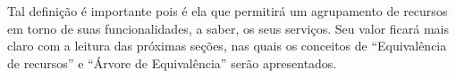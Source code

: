 Tal definição é importante pois é ela que permitirá um agrupamento de recursos em torno de suas funcionalidades, a saber, os seus serviços. Seu valor ficará mais claro com a leitura das próximas seções, nas quais os conceitos de ``Equivalência de recursos'' e ``Árvore de Equivalência'' serão apresentados.

\begin{comment}
Suponha que um usuário, por meio de uma aplicação de seu celular, deseja utilizar os serviços providos de um recurso de imagem. Considere ainda, que existam três instâncias disponíveis deste recurso no \emph{smart space}. Para garantir a equivalência dos recursos devemos garantir que eles possuam os mesmos serviços, e para isso, devemos garantir que os serviços possuam a mesma interface, ou seja, os mesmos tipos e número de parâmetros. Suponha que para o usuário que deseja o recurso simples de imagem seja indiferente a quantidade de \emph{megapixels} da imagem. Para o usuário basta apenas o provimento do serviço que retorne algum dado ou altere o estado de alguma aplicação. Dessa forma, devemos garantir que qualquer uma das três instâncias possam prover esse serviço. Uma câmera com \emph{flash}, por exemplo, para este cenário, seria equivalente a um recurso de câmera sem \emph{flash}.
\end{comment}





